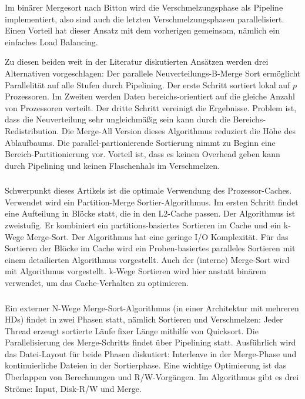 \documentclass[a4paper,12pt,twoside]{article}
\begin{document}
Im binärer Mergesort nach Bitton wird die Verschmelzungsphase als Pipeline implementiert, also sind auch die letzten Verschmelzungsphasen parallelisiert. Einen Vorteil hat dieser Ansatz mit dem vorherigen gemeinsam, nämlich ein einfaches Load Balancing.

Zu diesen beiden weit in der Literatur diskutierten Ansätzen werden drei Alternativen vorgeschlagen: Der parallele Neuverteilungs-B-Merge Sort ermöglicht Parallelität auf alle Stufen durch Pipelining. Der erste Schritt sortiert lokal auf $p$ Prozessoren. Im Zweiten werden Daten bereichs-orientiert auf die gleiche Anzahl von Prozessoren verteilt. Der dritte Schritt vereinigt die Ergebnisse. Problem ist, dass die Neuverteilung sehr ungleichmäßig sein kann durch die Bereichs-Redistribution. Die Merge-All Version dieses Algorithmus reduziert die Höhe des Ablaufbaums. Die parallel-partionierende Sortierung nimmt zu Beginn eine Bereich-Partitionierung vor. Vorteil ist, dass es keinen Overhead geben kann durch Pipelining und keinen Flaschenhals im Verschmelzen.

\subsubsection*{}

Schwerpunkt dieses Artikels ist die optimale Verwendung des Prozessor-Caches. Verwendet wird ein Partition-Merge Sortier-Algorithmus. Im ersten Schritt findet eine Aufteilung in Blöcke statt, die in den L2-Cache passen. Der Algorithmus ist zweistufig. Er kombiniert ein partitions-basiertes Sortieren im Cache und ein k-Wege Merge-Sort. Der Algorithmus hat eine geringe I/O Komplexität. Für das Sortieren der Blöcke im Cache wird ein Proben-basiertes paralleles Sortieren mit einem detailierten Algorithmus vorgestellt. Auch der (interne) Merge-Sort wird mit Algorithmus vorgestellt. k-Wege Sortieren wird hier anstatt binärem verwendet, um das Cache-Verhalten zu optimieren.

\subsubsection*{}

Ein externer N-Wege Merge-Sort-Algorithmus (in einer Architektur mit mehreren HDs) findet in zwei Phasen statt, nämlich Sortieren und Verschmelzen: Jeder Thread erzeugt sortierte Läufe fixer Länge mithilfe von Quicksort. Die Parallelisierung des Merge-Schritts findet über Pipelining statt. Ausführlich wird das Datei-Layout für beide Phasen diskutiert: Interleave in der Merge-Phase und kontinuierliche Dateien in der Sortierphase. Eine wichtige Optimierung ist das Überlappen von Berechnungen und R/W-Vorgängen. Im Algorithmus gibt es drei Ströme: Input, Disk-R/W und Merge. 
\end{document}
